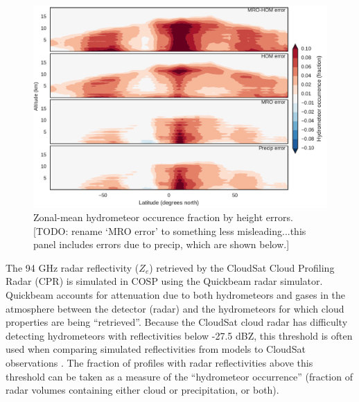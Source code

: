 \begin{figure}
\centering
\includegraphics[width=\columnwidth]{graphics/subgrid1_hfba_zonal_diff.pdf}
\caption{Zonal-mean hydrometeor occurence fraction by height errors. [TODO: rename `MRO error' to something less misleading...this panel includes errors due to precip, which are shown below.]}
\label{subgrid1_hfba_zonal_diff}
\end{figure}

The 94 GHz radar reflectivity ($Z_e$) retrieved by the CloudSat Cloud Profiling Radar (CPR) is simulated in COSP using the Quickbeam \citep{haynes_et_al_2007} radar simulator. Quickbeam accounts for attenuation due to both hydrometeors and gases in the atmosphere between the detector (radar) and the hydrometeors for which cloud properties are being ``retrieved''. Because the CloudSat cloud radar has difficulty detecting hydrometeors with reflectivities below -27.5 dBZ, this threshold is often used when comparing simulated reflectivities from models to CloudSat observations \citep{marchand_et_al_2009}. The fraction of profiles with radar reflectivities above this threshold can be taken as a measure of the ``hydrometeor occurrence'' (fraction of radar volumes containing either cloud or precipitation, or both). 

